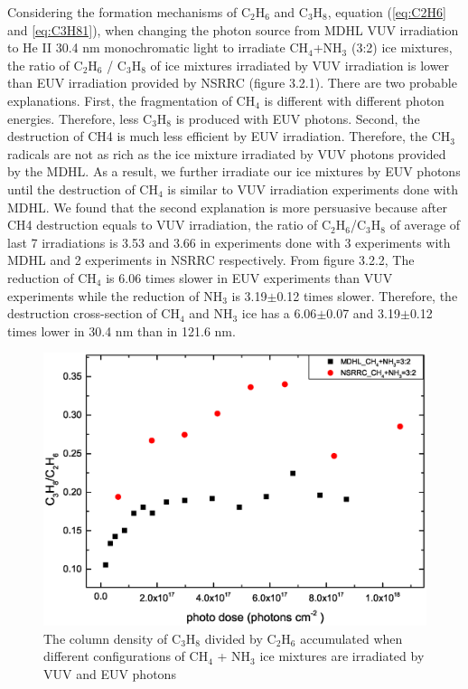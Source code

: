 Considering the formation mechanisms of C$_2$H$_6$ and C$_3$H$_8$, equation (\ref{eq:C2H6} and \ref{eq:C3H81}), when changing the photon source from MDHL VUV irradiation to He II 30.4 nm monochromatic light to irradiate CH$_4$+NH$_3$ (3:2) ice mixtures, the ratio of C$_2$H$_6$ / C$_3$H$_8$ of ice mixtures irradiated by VUV irradiation is lower than EUV irradiation provided by NSRRC (figure 3.2.1). There are two probable explanations. First, the fragmentation of CH$_4$ is different with different photon energies. Therefore, less C$_3$H$_8$ is produced with EUV photons. Second, the destruction of CH4 is much less efficient by EUV irradiation. Therefore, the CH$_3$ radicals are not as rich as the ice mixture irradiated by VUV photons provided by the MDHL. As a result, we further irradiate our ice mixtures by EUV photons until the destruction of CH$_4$ is similar to VUV irradiation experiments done with MDHL. We found that the second explanation is more persuasive because after CH4 destruction equals to VUV irradiation, the ratio of C$_2$H$_6$/C$_3$H$_8$ of average of last 7 irradiations is 3.53 and 3.66 in experiments done with 3 experiments with MDHL and 2 experiments in NSRRC respectively. From figure 3.2.2, The reduction of CH$_4$ is 6.06 times slower in EUV experiments than VUV experiments while the reduction of NH$_3$ is 3.19$\pm$0.12 times slower. Therefore, the destruction cross-section of CH$_4$ and NH$_3$ ice has a 6.06$\pm$0.07 and 3.19$\pm$0.12 times lower in 30.4 nm than in 121.6 nm.

\begin{figure}
\centering
\includegraphics[width=\textwidth]{figures/chapter3/NSRRC_Lab_C3H8_C2H6.eps}
\caption{The column density of C$_3$H$_8$ divided by C$_2$H$_6$ accumulated when different configurations of CH$_4$ + NH$_3$ ice mixtures are irradiated by VUV and EUV photons}
\label{fig:NSRRC_Lab_C3H8_C2H6}
\end{figure}

